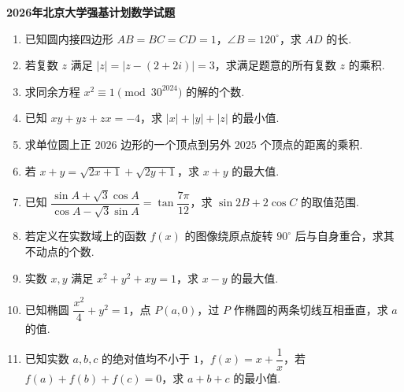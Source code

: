 \documentclass[a4paper,11pt]{report}
\newcommand{\solutionblank}{\par\vspace{7cm}}
\begin{document}
\begin{center}
    {\Large \bfseries 2026年北京大学强基计划数学试题}
\end{center}

\begin{enumerate}
    \item 已知圆内接四边形 $AB=BC=CD=1$，$\angle B=120^\circ$，求 $AD$ 的长. 

    \solutionblank

    \item 若复数 $z$ 满足 $|z|=|z-(2+2i)|=3$，求满足题意的所有复数 $z$ 的乘积. 

    \solutionblank

    \item 求同余方程 $x^2\equiv 1\pmod{30^{2024}}$ 的解的个数. 

    \solutionblank

    \item 已知 $xy+yz+zx=-4$，求 $|x|+|y|+|z|$ 的最小值. 

    \solutionblank

    \item 求单位圆上正 $2026$ 边形的一个顶点到另外 $2025$ 个顶点的距离的乘积. 

    \solutionblank

    \item 若 $x+y=\sqrt{2x+1}+\sqrt{2y+1}$，求 $x+y$ 的最大值. 

    \solutionblank

    \item 已知 $\dfrac{\sin A+\sqrt{3}\cos A}{\cos A-\sqrt{3}\sin A}=\tan\dfrac{7\pi}{12}$，求 $\sin 2B+2\cos C$ 的取值范围. 

    \solutionblank

    \item 若定义在实数域上的函数 $f(x)$ 的图像绕原点旋转 $90^\circ$ 后与自身重合，求其不动点的个数. 

    \solutionblank

    \item 实数 $x,y$ 满足 $x^2+y^2+xy=1$，求 $x-y$ 的最大值. 

    \solutionblank

    \item 已知椭圆 $\dfrac{x^2}{4}+y^2=1$，点 $P(a,0)$，过 $P$ 作椭圆的两条切线互相垂直，求 $a$ 的值. 

    \solutionblank

    \item 已知实数 $a,b,c$ 的绝对值均不小于 $1$，$f(x)=x+\dfrac{1}{x}$，若 $f(a)+f(b)+f(c)=0$，求 $a+b+c$ 的最小值. 


\end{enumerate}
\end{document}
